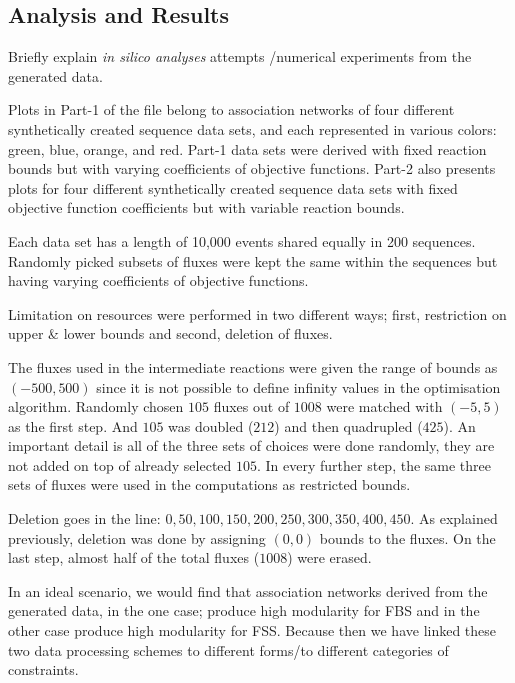 \subsection*{Analysis and Results}
%

{\color{red} 
	
	Briefly explain \emph{in silico analyses} attempts /numerical experiments from the generated data.
	
	Plots in Part-1 of the file belong to association networks of four different synthetically created sequence data sets, and each represented in various colors: green, blue, orange, and red. Part-1 data sets were derived with fixed reaction bounds but with varying coefficients of objective functions. Part-2 also presents plots for four different synthetically created sequence data sets with fixed objective function coefficients but with variable reaction bounds.
	
	Each data set has a length of 10,000 events shared equally in 200 sequences. Randomly picked subsets of fluxes were kept the same within the sequences but having varying coefficients of objective functions.
	
	
	
	Limitation on resources were performed in two different ways; first, restriction on upper \& lower bounds and second, deletion of fluxes.
	
	The fluxes used in the intermediate reactions were given the range of bounds as $(-500, 500)$ since it is not possible to define infinity values in the optimisation algorithm. Randomly chosen $105$ fluxes out of $1008$ were matched with $(-5, 5)$ as the first step. And $105$ was doubled ($212$) and then quadrupled ($425$). An important detail is all of the three sets of choices were done randomly, they are not added on top of already selected $105$. In every further step, the same three sets of fluxes were used in the computations as restricted bounds.
	
	Deletion goes in the line: $0, 50, 100, 150, 200, 250, 300, 350, 400, 450$. As explained previously, deletion was done by assigning $(0, 0)$ bounds to the fluxes. On the last step, almost half of the total fluxes ($1008$) were erased.
	
	In an ideal scenario, we would find that association networks derived from the generated data, in the one case; produce high modularity for FBS and in the other case produce high modularity for FSS. Because then we have linked these two data processing schemes to different forms/to different categories of constraints.
	
}
